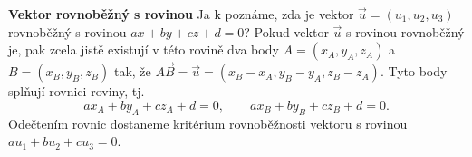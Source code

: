 \wikitextrule
\begin{example}\label{mai:exam042}
  \textbf{Vektor rovnoběžný s rovinou}\newline\small
   Ja k poznáme, zda je vektor \(\vec{u} = (u_1, u_2, u_3)\) rovnoběžný s rovinou \(ax + by + cz + 
   d = 0\)? Pokud vektor \(\vec{u}\) s rovinou rovnoběžný je, pak zcela jistě existují v této 
   rovině dva body \(A = (x_A, y_A, z_A)\) a \(B = (x_B, y_B, z_B)\) tak, že \(\overrightarrow{AB} 
   = \vec{u} = (x_B - x_A, y_B - y_A, z_B - z_A)\). Tyto body splňují rovnici roviny, tj.
   \begin{equation*}
     ax_A + by_A + cz_A + d = 0,\qquad ax_B + by_B + cz_B + d = 0.
   \end{equation*}
   Odečtením rovnic dostaneme kritérium rovnoběžnosti vektoru s rovinou \(au_1 + bu_2+ cu_3 = 0\).
   \normalsize
\end{example}
